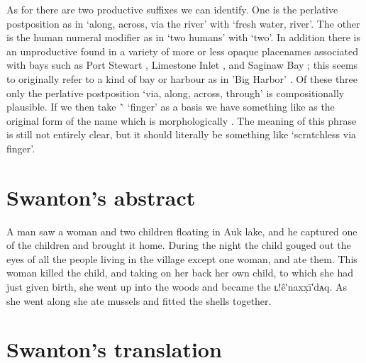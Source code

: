 As for  there are two productive  suffixes we can identify.
One  is the perlative postposition as in  ‘along, across, via the river’ with  ‘fresh water, river’.
The other  is the human numeral modifier as in  ‘two humans’ with  ‘two’.
In addition there is an unproductive  found in a variety of more or less opaque placenames associated with bays such as  Port Stewart \parencite[187 \#149]{thornton:2012},  Limestone Inlet \parencite[77 \#142]{thornton:2012}, and  Saginaw Bay \parencite[125, 136 \#133]{thornton:2012}; this seems to originally refer to a kind of bay or harbour as in  ’Big Harbor’ \parencite[170 \#119]{thornton:2012}.
Of these three only the perlative postposition  ‘via, along, across, through’ is compositionally plausible.
If we then take  \~\  ‘finger’ as a basis we have something like  as the original form of the name which is morphologically .
The meaning of this phrase is still not entirely clear, but it should literally be something like ‘scratchless via finger’.

\section{Swanton’s abstract}\label{sec:94-swanton-abstract}

A man saw a woman and two children floating in Auk lake, and he captured one of the children and brought it home.
During the night the child gouged out the eyes of all the people living in the village except one woman, and ate them.
This woman killed the child, and taking on her back her own child, to which she had just given birth, she went up into the woods and became the ʟ!ê′naxx̣ī′dᴀq.
As she went along she ate mussels and fitted the shells together.

\section{Swanton’s translation}\label{sec:94-swanton-translation}

